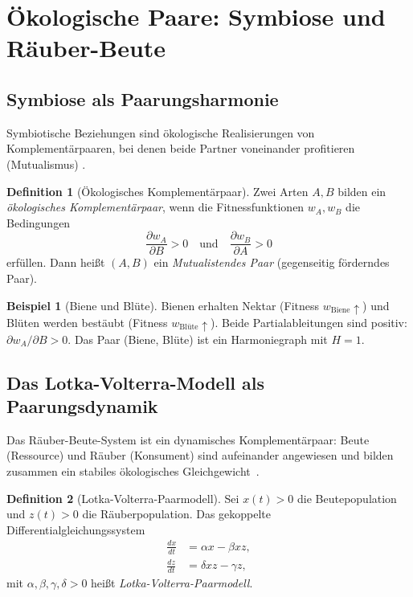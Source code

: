 ﻿\documentclass[a4paper,12pt]{article}
\theoremstyle{definition}
\newtheorem{definition}{Definition}
\newtheorem{beispiel}{Beispiel}
\begin{document}
\section{Ökologische Paare: Symbiose und Räuber-Beute}
\label{sec:oekologie}

\subsection{Symbiose als Paarungsharmonie}

Symbiotische Beziehungen sind ökologische Realisierungen von Komplementärpaaren,
bei denen beide Partner voneinander profitieren (Mutualismus) \cite{may1972}.

\begin{definition}[Ökologisches Komplementärpaar]
	Zwei Arten $A, B$ bilden ein \emph{ökologisches Komplementärpaar}, wenn
	die Fitnessfunktionen $w_A, w_B$ die Bedingungen
	\[
		\frac{\partial w_A}{\partial B} > 0 \quad\text{und}\quad
		\frac{\partial w_B}{\partial A} > 0
	\]
	erfüllen. Dann heißt $(A, B)$ ein \emph{Mutualistendes Paar} (gegenseitig
	förderndes Paar).
\end{definition}

\begin{beispiel}[Biene und Blüte]
	Bienen erhalten Nektar (Fitness $w_\mathrm{Biene} \uparrow$) und Blüten werden
	bestäubt (Fitness $w_\mathrm{Blüte} \uparrow$). Beide Partialableitungen sind
	positiv: $\partial w_A / \partial B > 0$. Das Paar (Biene, Blüte) ist ein
	Harmoniegraph mit $H = 1$.
\end{beispiel}

\subsection{Das Lotka-Volterra-Modell als Paarungsdynamik}

Das Räuber-Beute-System ist ein dynamisches Komplementärpaar: Beute (Ressource) und
Räuber (Konsument) sind aufeinander angewiesen und bilden zusammen ein stabiles
ökologisches Gleichgewicht~\cite{lotka1925,volterra1926}.

\begin{definition}[Lotka-Volterra-Paarmodell]
	Sei $x(t) > 0$ die Beutepopulation und $z(t) > 0$ die Räuberpopulation.
	Das gekoppelte Differentialgleichungssystem
	\begin{align}
		\frac{dx}{dt} &= \alpha x - \beta x z, \label{eq:beute} \\
		\frac{dz}{dt} &= \delta x z - \gamma z, \label{eq:raeuber}
	\end{align}
	mit $\alpha, \beta, \gamma, \delta > 0$ heißt \emph{Lotka-Volterra-Paarmodell}.
\end{definition}
\end{document}
